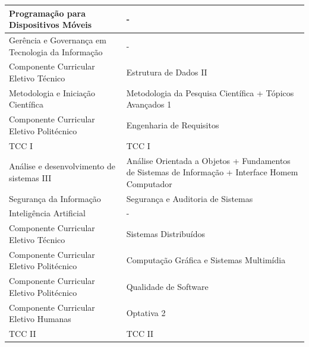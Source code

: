 \documentclass[11pt,fleqn]{book} %
\begin{document}
\begin{table}[]
{\begin{tabular}{|l|l|}
				Programação para Dispositivos Móveis      & -                                                                                                \\ \hline
				Gerência e Governança em Tecnologia da Informação                & -                                                                                                \\ \hline
				Componente Curricular Eletivo Técnico     & Estrutura de Dados II                                                                            \\ \hline
				Metodologia e Iniciação Científica        & Metodologia da Pesquisa Científica + Tópicos Avançados 1                                         \\ \hline
				Componente Curricular Eletivo Politécnico & Engenharia de Requisitos                                                                         \\ \hline
				TCC I                                     & TCC I                                                                                            \\ \hline
				Análise e desenvolvimento de sistemas III & Análise Orientada a Objetos + Fundamentos de Sistemas de Informação + Interface Homem Computador \\ \hline
				Segurança da Informação                   & Segurança e Auditoria de Sistemas                                                                \\ \hline
				Inteligência Artificial                   & -                                                                                                \\ \hline
				Componente Curricular Eletivo Técnico     & Sistemas Distribuídos                                                                            \\ \hline
				Componente Curricular Eletivo Politécnico & Computação Gráfica e Sistemas Multimídia                                                         \\ \hline
				Componente Curricular Eletivo Politécnico & Qualidade de Software                                                                            \\ \hline
				Componente Curricular Eletivo Humanas     & Optativa 2                                                                                       \\ \hline
				TCC II                                    & TCC II                                                                                           \\ \hline
			\end{tabular}%
		}
	\end{table}
\end{document}

